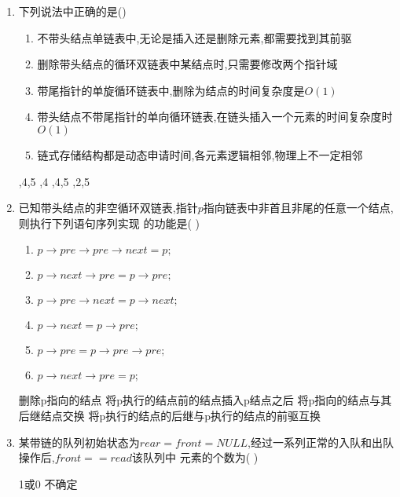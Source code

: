 \documentclass[12pt, a4paper, oneside, UTF8]{ctexbook}
\begin{document}
\begin{enumerate}
    \item 下列说法中正确的是() 
    \begin{enumerate}[label= (\arabic*)]
        \item 不带头结点单链表中,无论是插入还是删除元素,都需要找到其前驱 
        \item 删除带头结点的循环双链表中某结点时,只需要修改两个指针域
        \item 带尾指针的单旋循环链表中,删除为结点的时间复杂度是$O(1)$
        \item 带头结点不带尾指针的单向循环链表,在链头插入一个元素的时间复杂度时$O(1)$
        \item \bl 链式存储结构都是动态申请时间,各元素逻辑相邻,物理上不一定相邻 
    \end{enumerate}
    \begin{choices}
        ,4,5 ,4 ,4,5 ,2,5
    \end{choices}

    
    \item 已知带头结点的非空循环双链表,指针$p$指向链表中非首且非尾的任意一个结点,则执行下列语句序列实现
    的功能是(   ) 
    \begin{enumerate}[label= (\arabic*)]
        \item $p\rightarrow pre \rightarrow pre \rightarrow next = p;$ 
        \item $p\rightarrow next \rightarrow pre = p \rightarrow pre;$
        \item $p\rightarrow pre\rightarrow next = p\rightarrow next;$
        \item $p\rightarrow next = p\rightarrow pre;$
        \item $p\rightarrow pre = p\rightarrow pre \rightarrow pre;$
        \item $p\rightarrow next \rightarrow pre = p;$
    \end{enumerate}

    \begin{choices}[1]
        \task 删除p指向的结点 
        \task 将p执行的结点前的结点插入p结点之后 
        \task 将p指向的结点与其后继结点交换
        \task 将p执行的结点的后继与p执行的结点的前驱互换 
    \end{choices}

    \item 某带链的队列初始状态为$rear=front=NULL$,经过一系列正常的入队和出队操作后,$front==read$该队列中
    元素的个数为(   )
    \begin{choices}
          \task 1或0 \task 不确定
    \end{choices}


\end{enumerate}
\end{document}
